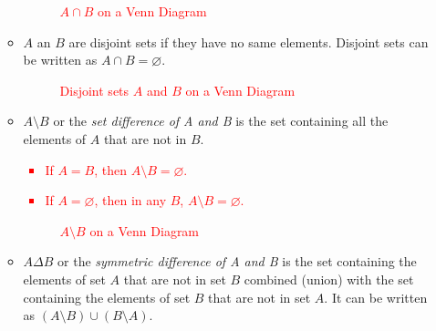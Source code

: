 \begin{itemize}
\begin{itemize}
	\begin{figure}[h!]
	\centering
\caption{\textcolor{red}{$A \cap B$ on a Venn Diagram}}
	\end{figure}
	\item $A$ an $B$ are disjoint sets if they have no same elements. Disjoint sets can be written as $A \cap B=\varnothing$.
	\begin{figure}[h!]
	\centering
\caption{\textcolor{red}{Disjoint sets $A$ and $B$ on a Venn Diagram}}
	\end{figure}
	\item $A \setminus B$ or the \textit{set difference of A and B} is the set containing all the elements of $A$ that are not in $B$.
	\textcolor{red}{
	\begin{itemize}
		\item If $A=B$, then $A \setminus B=\varnothing$.
		\item If $A=\varnothing$, then in any $B$, $A \setminus B=\varnothing$.
	\end{itemize}
	}
	\begin{figure}[h!]
	\centering
\caption{\textcolor{red}{$A \setminus B$ on a Venn Diagram}}
	\end{figure}
	\item $A \Delta B$ or the \textit{symmetric difference of A and B} is  the set containing the elements of set $A$ that are not in set $B$ combined (union) with the set containing the elements of set $B$ that are not in set $A$. It can be written as $(A \setminus B) \cup (B \setminus A)$. 

\end{itemize}
\end{itemize}
